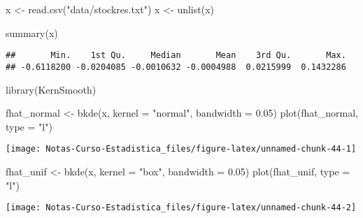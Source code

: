 \documentclass[
  12pt,
]{book}
\newenvironment{Shaded}{\begin{snugshade}}{\end{snugshade}}
\newcommand{\AttributeTok}[1]{\textcolor[rgb]{0.77,0.63,0.00}{#1}}
\newcommand{\FloatTok}[1]{\textcolor[rgb]{0.00,0.00,0.81}{#1}}
\newcommand{\FunctionTok}[1]{\textcolor[rgb]{0.00,0.00,0.00}{#1}}
\newcommand{\NormalTok}[1]{#1}
\newcommand{\OtherTok}[1]{\textcolor[rgb]{0.56,0.35,0.01}{#1}}
\newcommand{\StringTok}[1]{\textcolor[rgb]{0.31,0.60,0.02}{#1}}
\theoremstyle{definition}
\theoremstyle{definition}
\theoremstyle{definition}
\theoremstyle{definition}
\theoremstyle{remark}
\begin{document}
\begin{Shaded}
\begin{Highlighting}[]
\NormalTok{x }\OtherTok{\textless{}{-}} \FunctionTok{read.csv}\NormalTok{(}\StringTok{"data/stockres.txt"}\NormalTok{)}
\NormalTok{x }\OtherTok{\textless{}{-}} \FunctionTok{unlist}\NormalTok{(x)}
\end{Highlighting}
\end{Shaded}

\begin{Shaded}
\begin{Highlighting}[]
\FunctionTok{summary}\NormalTok{(x)}
\end{Highlighting}
\end{Shaded}

\begin{verbatim}
##       Min.    1st Qu.     Median       Mean    3rd Qu.       Max. 
## -0.6118200 -0.0204085 -0.0010632 -0.0004988  0.0215999  0.1432286
\end{verbatim}

\begin{Shaded}
\begin{Highlighting}[]
\FunctionTok{library}\NormalTok{(KernSmooth)}

\NormalTok{fhat\_normal }\OtherTok{\textless{}{-}} \FunctionTok{bkde}\NormalTok{(x, }\AttributeTok{kernel =} \StringTok{"normal"}\NormalTok{, }\AttributeTok{bandwidth =} \FloatTok{0.05}\NormalTok{)}
\FunctionTok{plot}\NormalTok{(fhat\_normal, }\AttributeTok{type =} \StringTok{"l"}\NormalTok{)}
\end{Highlighting}
\end{Shaded}

\begin{center}\texttt{[image: Notas-Curso-Estadistica\_files/figure-latex/unnamed-chunk-44-1]} \end{center}

\begin{Shaded}
\begin{Highlighting}[]
\NormalTok{fhat\_unif }\OtherTok{\textless{}{-}} \FunctionTok{bkde}\NormalTok{(x, }\AttributeTok{kernel =} \StringTok{"box"}\NormalTok{, }\AttributeTok{bandwidth =} \FloatTok{0.05}\NormalTok{)}
\FunctionTok{plot}\NormalTok{(fhat\_unif, }\AttributeTok{type =} \StringTok{"l"}\NormalTok{)}
\end{Highlighting}
\end{Shaded}

\begin{center}\texttt{[image: Notas-Curso-Estadistica\_files/figure-latex/unnamed-chunk-44-2]} \end{center}
\end{document}

